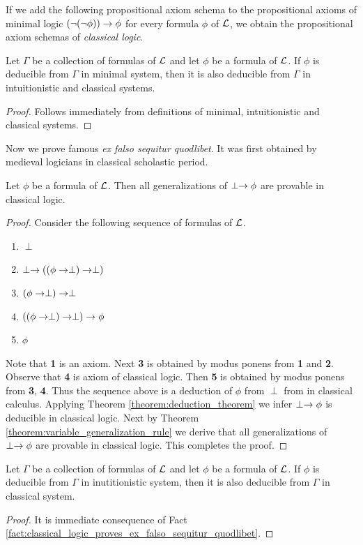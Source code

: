 \documentclass[10pt]{amsart}
\begin{document}
\begin{definition}
	If we add the following propositional axiom schema to the propositional axioms of minimal logic $\left(\neg (\neg \phi)\right) \rightarrow \phi$
	for every formula $\phi$ of ${\mathcal L}$, we obtain the propositional axiom schemas of \textit{classical logic}.
\end{definition}

\begin{fact}\label{fact:classical_amd_intuitionistic_are_stronger_than_minimal}
	Let $\Gamma$ be a collection of formulas of ${\mathcal L}$ and let $\phi$ be a formula of ${\mathcal L}$. If $\phi$ is deducible from $\Gamma$ in minimal system, then it is also deducible from $\Gamma$ in intuitionistic and classical systems.
\end{fact}
\begin{proof}
	Follows immediately from definitions of minimal, intuitionistic and classical systems.
\end{proof}
\noindent
Now we prove famous \textit{ex falso sequitur quodlibet}. It was first obtained by medieval logicians in classical scholastic period.

\begin{fact}\label{fact:classical_logic_proves_ex_falso_sequitur_quodlibet}
	Let $\phi$ be a formula of ${\mathcal L}$. Then all generalizations of $\perp \rightarrow \phi$ are provable in classical logic.
\end{fact}
\begin{proof}
	Consider the following sequence of formulas of ${\mathcal L}$.
	\begin{enumerate}[label=\textbf{\arabic*.}]
		\item $\perp$
		\item $\perp \rightarrow \left((\phi \rightarrow \perp)\rightarrow \perp\right)$
		\item $(\phi \rightarrow \perp)\rightarrow \perp$
		\item $\left((\phi \rightarrow \perp)\rightarrow \perp\right) \rightarrow \phi$
		\item $\phi$
	\end{enumerate}
	Note that \textbf{1} is an axiom. Next \textbf{3} is obtained by modus ponens from \textbf{1} and \textbf{2}. Observe that \textbf{4} is axiom of classical logic. Then \textbf{5} is obtained by modus ponens from \textbf{3}, \textbf{4}. Thus the sequence above is a deduction of $\phi$ from $\perp$ from in classical calculus. Applying Theorem \ref{theorem:deduction_theorem} we infer $\perp \rightarrow \phi$ is deducible in classical logic. Next by Theorem \ref{theorem:variable_generalization_rule} we derive that all generalizations of $\perp \rightarrow \phi$ are provable in classical logic. This completes the proof.
\end{proof}

\begin{corollary}\label{corollary:classical_logic_is_stronger_than_intuitionistic_logic}
	Let $\Gamma$ be a collection of formulas of ${\mathcal L}$ and let $\phi$ be a formula of ${\mathcal L}$. If $\phi$ is deducible from $\Gamma$ in inutitionistic system, then it is also deducible from $\Gamma$ in classical system.
\end{corollary}
\begin{proof}
	It is immediate consequence of Fact \ref{fact:classical_logic_proves_ex_falso_sequitur_quodlibet}.
\end{proof}
\end{document}
